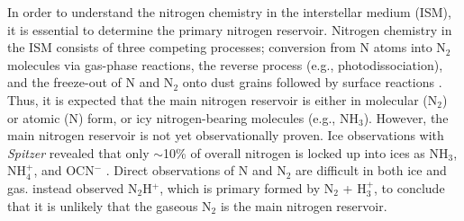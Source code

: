 \documentclass[12pt,a4paper]{article}  %
\newcommand{\ammonia}{NH$_3$\xspace}
\begin{document}
\smallskip
\noindent In order to understand the nitrogen chemistry in the interstellar medium (ISM), it is essential to determine the primary nitrogen reservoir. Nitrogen chemistry in the ISM consists of three competing processes; conversion from N atoms into N$_2$ molecules via gas-phase reactions, the reverse process (e.g., photodissociation), and the freeze-out of N and N$_2$ onto dust grains followed by surface reactions \citep[e.g.,][]{Daranlot12}. Thus, it is expected that the main nitrogen reservoir is either in molecular (N$_2$) or atomic (N) form, or icy nitrogen-bearing molecules (e.g., \ammonia). However, the main nitrogen reservoir is not yet observationally proven. Ice observations with \textit{Spitzer} revealed that only $\sim$10\% of overall nitrogen is locked up into ices as \ammonia, NH$_4^+$, and OCN$^-$ \citep{Oberg11}. Direct observations of N and N$_2$ are difficult in both ice and gas. \citet{Maret06} instead observed N$_2$H$^+$, which is primary formed by N$_2$ + H$_3^+$, to conclude that it is unlikely that the gaseous N$_2$ is the main nitrogen reservoir. %
\end{document}
